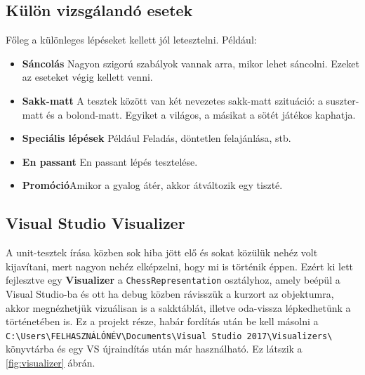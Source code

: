 \documentclass[twoside, a4paper, 12pt]{book}
\begin{document}
\subsection{Külön vizsgálandó esetek}
Főleg a különleges lépéseket kellett jól letesztelni. Például:
\begin{itemize}
	\item \textbf{Sáncolás} Nagyon szigorú szabályok vannak arra, mikor lehet sáncolni. Ezeket az eseteket végig kellett venni.
	
	\item \textbf{Sakk-matt} A tesztek között van két nevezetes sakk-matt szituáció: a suszter-matt és a bolond-matt. Egyiket a világos, a másikat a sötét játékos kaphatja.
	
	\item \textbf{Speciális lépések} Például Feladás, döntetlen felajánlása, stb.
	
	\item \textbf{En passant} En passant lépés tesztelése.
	
	\item \textbf{Promóció}Amikor a gyalog átér, akkor átváltozik egy tiszté.
\end{itemize}

\subsection{Visual Studio Visualizer}
A unit-tesztek írása közben sok hiba jött elő és sokat közülük nehéz volt kijavítani, mert nagyon nehéz elképzelni, hogy mi is történik éppen. Ezért ki lett fejlesztve egy \textbf{Visualizer} a \texttt{ChessRepresentation} osztályhoz, amely beépül a Visual Studio-ba és ott ha debug közben rávisszük a kurzort az objektumra, akkor megnézhetjük vizuálisan is a sakktáblát, illetve oda-vissza lépkedhetünk a történetében is. Ez a projekt része, habár fordítás után be kell másolni a \texttt{C:\textbackslash Users\textbackslash FELHASZNÁLÓNÉV\textbackslash Documents\textbackslash Visual Studio 2017\textbackslash Visualizers\textbackslash} könyvtárba és egy VS újraindítás után már használható. Ez látszik a \ref{fig:visualizer} ábrán.
\end{document}
